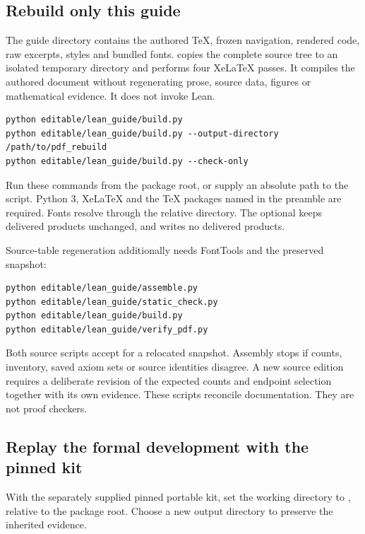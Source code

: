 \subsection{Rebuild only this guide}
The guide directory contains the authored TeX, frozen navigation, rendered code, raw excerpts, styles and bundled fonts.  copies the complete source tree to an isolated temporary directory and performs four XeLaTeX passes. It compiles the authored document without regenerating prose, source data, figures or mathematical evidence. It does not invoke Lean.

\begin{Verbatim}[fontsize=\small,breaklines=true,breakanywhere=true]
python editable/lean_guide/build.py
python editable/lean_guide/build.py --output-directory /path/to/pdf_rebuild
python editable/lean_guide/build.py --check-only
\end{Verbatim}

Run these commands from the package root, or supply an absolute path to the script. Python 3, XeLaTeX and the TeX packages named in the preamble are required. Fonts resolve through the relative  directory. The optional  keeps delivered products unchanged, and  writes no delivered products.

Source-table regeneration additionally needs FontTools and the preserved snapshot:

\begin{Verbatim}[fontsize=\small,breaklines=true,breakanywhere=true]
python editable/lean_guide/assemble.py
python editable/lean_guide/static_check.py
python editable/lean_guide/build.py
python editable/lean_guide/verify_pdf.py
\end{Verbatim}

Both source scripts accept  for a relocated snapshot. Assembly stops if counts, inventory, saved axiom sets or source identities disagree. A new source edition requires a deliberate revision of the expected counts and endpoint selection together with its own evidence. These scripts reconcile documentation. They are not proof checkers.

\subsection{Replay the formal development with the pinned kit}
With the separately supplied pinned portable kit, set the working directory to , relative to the package root. Choose a new output directory to preserve the inherited evidence.

